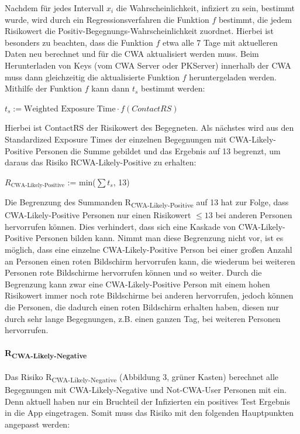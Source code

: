 \documentclass[conference]{IEEEtran}
\begin{document}
Nachdem für jedes Intervall $x_i$ die Wahrscheinlichkeit, infiziert zu sein, bestimmt wurde, wird durch ein Regressionsverfahren die Funktion $f$ bestimmt, 
die jedem Risikowert die Positiv-Begegnungs-Wahrscheinlichkeit zuordnet. Hierbei ist besonders zu beachten, 
dass die Funktion $f$ etwa alle 7 Tage mit aktuelleren Daten neu berechnet und für die CWA aktualisiert werden muss. 
Beim Herunterladen von Keys (vom CWA Server oder PKServer) innerhalb der CWA muss dann gleichzeitig die aktualisierte Funktion $f$ heruntergeladen werden. 
Mithilfe der Funktion $f$ kann dann $t_s$ bestimmt werden: 

\centerline{\text{ }}
\centerline{$t_s := \text{Weighted Exposure Time} \cdot f(ContactRS)$}
\centerline{\text{ }}

Hierbei ist ContactRS der Risikowert des Begegneten.
Als nächstes wird aus den Standardized Exposure Times der einzelnen Begegnungen mit CWA-Likely-Positive Personen die Summe gebildet und das Ergebnis auf 13 begrenzt, 
um daraus das Risiko RCWA-Likely-Positive zu erhalten:

\centerline{\text{ }}
\centerline{$R_{\text{CWA-Likely-Positive}}$ := min($\sum t_s$, 13)}
\centerline{\text{ }}

Die Begrenzung des Summanden R\textsubscript{CWA-Likely-Positive} auf 13 hat zur Folge, 
dass CWA-Likely-Positive Personen nur einen Risikowert $\le 13$ bei anderen Personen hervorrufen können. 
Dies verhindert, dass sich eine Kaskade von CWA-Likely-Positive Personen bilden kann. Nimmt man diese Begrenzung nicht vor, 
ist es möglich, dass eine einzelne CWA-Likely-Positive Person bei einer großen Anzahl an Personen einen roten Bildschirm hervorrufen kann, 
die wiederum bei weiteren Personen rote Bildschirme hervorrufen können und so weiter. 
Durch die Begrenzung kann zwar eine CWA-Likely-Positive Person mit einem hohen Risikowert immer noch rote Bildschirme bei anderen hervorrufen, 
jedoch können die Personen, die dadurch einen roten Bildschirm erhalten haben, diesen nur durch sehr lange Begegnungen, z.B. einen ganzen Tag, bei weiteren Personen hervorrufen.\\
\paragraph{R\textsubscript{CWA-Likely-Negative}}
Das Risiko R\textsubscript{CWA-Likely-Negative} (Abbildung 3, grüner Kasten) berechnet alle Begegnungen mit CWA-Likely-Negative und Not-CWA-User Personen mit ein.
Denn aktuell haben nur ein Bruchteil der Infizierten ein positives Test Ergebnis in die App eingetragen. 
Somit muss das Risiko mit den folgenden Hauptpunkten angepasst werden:
\end{document}

